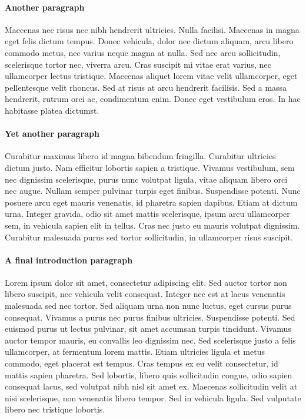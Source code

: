 \documentclass[letterpaper,11pt,leqno]{article}
\begin{document}
\paragraph{Another paragraph} Maecenas nec risus nec nibh hendrerit ultricies. Nulla facilisi. Maecenas in magna eget felis dictum tempus. Donec vehicula, dolor nec dictum aliquam, arcu libero commodo metus, nec varius neque magna at nulla. Sed nec arcu sollicitudin, scelerisque tortor nec, viverra arcu. Cras suscipit mi vitae erat varius, nec ullamcorper lectus tristique. Maecenas aliquet lorem vitae velit ullamcorper, eget pellentesque velit rhoncus. Sed at risus at arcu hendrerit facilisis. Sed a massa hendrerit, rutrum orci ac, condimentum enim. Donec eget vestibulum eros. In hac habitasse platea dictumst.

\paragraph{Yet another paragraph} Curabitur maximus libero id magna bibendum fringilla. Curabitur ultricies dictum justo. Nam efficitur lobortis sapien a tristique. Vivamus vestibulum, sem nec dignissim scelerisque, purus nunc volutpat ligula, vitae aliquam libero orci nec augue. Nullam semper pulvinar turpis eget finibus. Suspendisse potenti. Nunc posuere arcu eget mauris venenatis, id pharetra sapien dapibus. Etiam at dictum urna. Integer gravida, odio sit amet mattis scelerisque, ipsum arcu ullamcorper sem, in vehicula sapien elit in tellus. Cras nec justo eu mauris volutpat dignissim. Curabitur malesuada purus sed tortor sollicitudin, in ullamcorper risus suscipit.

\paragraph{A final introduction paragraph} Lorem ipsum dolor sit amet, consectetur adipiscing elit. Sed auctor tortor non libero suscipit, nec vehicula velit consequat. Integer nec est at lacus venenatis malesuada sed nec tortor. Sed aliquam urna non nunc luctus, eget cursus purus consequat. Vivamus a purus nec purus finibus ultricies. Suspendisse potenti. Sed euismod purus ut lectus pulvinar, sit amet accumsan turpis tincidunt. Vivamus auctor tempor mauris, eu convallis leo dignissim nec. Sed scelerisque justo a felis ullamcorper, at fermentum lorem mattis. Etiam ultricies ligula et metus commodo, eget placerat est tempus. Cras tempus ex eu velit consectetur, id mattis sapien pharetra. Sed lobortis, libero quis sollicitudin congue, odio sapien consequat lacus, sed volutpat nibh nisl sit amet ex. Maecenas sollicitudin velit at nisi scelerisque, non venenatis libero tempor. Sed in vehicula ligula. Sed vulputate libero nec tristique lobortis.
\end{document}
